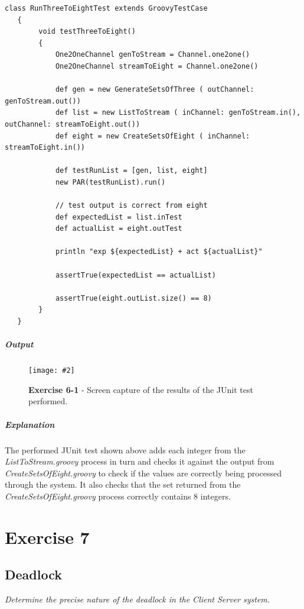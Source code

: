 \documentclass[10pt, a4paper]{article}
\newcommand{\figuremacro}[5]{
    \begin{figure}[#1]
        \centering
        \texttt{[image: \#2]}
        \caption[#3]{\textbf{#3}#4}
        \label{fig:#2}
    \end{figure}
}
\begin{document}
   \begin{lstlisting}[caption = "RunThreeToEightTest.groovy"]
   class RunThreeToEightTest extends GroovyTestCase
   {
   		void testThreeToEight()
   		{
   			One2OneChannel genToStream = Channel.one2one()
  	 		One2OneChannel streamToEight = Channel.one2one()
   
  			def gen = new GenerateSetsOfThree ( outChannel: genToStream.out())
   			def list = new ListToStream ( inChannel: genToStream.in(), outChannel: streamToEight.out())
   			def eight = new CreateSetsOfEight ( inChannel: streamToEight.in())
   
   			def testRunList = [gen, list, eight]
   			new PAR(testRunList).run()
   
   			// test output is correct from eight
   			def expectedList = list.inTest
   			def actualList = eight.outTest
   
   			println "exp ${expectedList} + act ${actualList}"
   
   			assertTrue(expectedList == actualList)
   			
   			assertTrue(eight.outList.size() == 8)
   		}
   }   \end{lstlisting}
   
   \subparagraph{Output}
   
   \figuremacro{H}{unitTest}{Exercise 6-1}{ - Screen capture of the results of the JUnit test performed.}{0.7}
   
   \subparagraph{Explanation}
   
   The performed JUnit test shown above adds each integer from the \textit{ListToStream.groovy} process in turn and checks it against the output from \textit{CreateSetsOfEight.groovy} to check if the values are correctly being processed through the system. It also checks that the set returned from the \textit{CreateSetsOfEight.groovy} process correctly contains 8 integers.
   
   	\setcounter{section}{7}
	\section*{Exercise 7}	
	
	\setcounter{subsection}{0}
	\subsection{Deadlock}

    \textit{Determine the precise nature of the deadlock in the Client Server system.}
    
\end{document}
